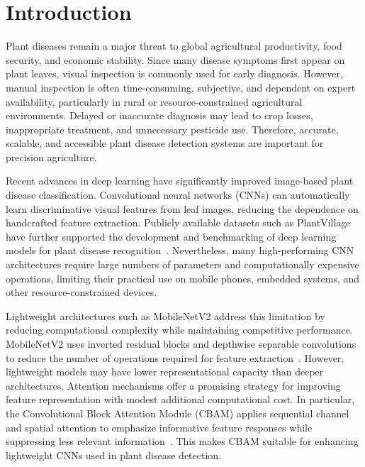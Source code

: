 \section{Introduction}

Plant diseases remain a major threat to global agricultural productivity, food security, and economic stability. Since many disease symptoms first appear on plant leaves, visual inspection is commonly used for early diagnosis. However, manual inspection is often time-consuming, subjective, and dependent on expert availability, particularly in rural or resource-constrained agricultural environments. Delayed or inaccurate diagnosis may lead to crop losses, inappropriate treatment, and unnecessary pesticide use. Therefore, accurate, scalable, and accessible plant disease detection systems are important for precision agriculture.

Recent advances in deep learning have significantly improved image-based plant disease classification. Convolutional neural networks (CNNs) can automatically learn discriminative visual features from leaf images, reducing the dependence on handcrafted feature extraction. Publicly available datasets such as PlantVillage have further supported the development and benchmarking of deep learning models for plant disease recognition~\cite{mohanty2016,hughes2015open}. Nevertheless, many high-performing CNN architectures require large numbers of parameters and computationally expensive operations, limiting their practical use on mobile phones, embedded systems, and other resource-constrained devices.

Lightweight architectures such as MobileNetV2 address this limitation by reducing computational complexity while maintaining competitive performance. MobileNetV2 uses inverted residual blocks and depthwise separable convolutions to reduce the number of operations required for feature extraction~\cite{sandler2018mobilenetv2}. However, lightweight models may have lower representational capacity than deeper architectures. Attention mechanisms offer a promising strategy for improving feature representation with modest additional computational cost. In particular, the Convolutional Block Attention Module (CBAM) applies sequential channel and spatial attention to emphasize informative feature responses while suppressing less relevant information~\cite{woo2018cbam}. This makes CBAM suitable for enhancing lightweight CNNs used in plant disease detection.

